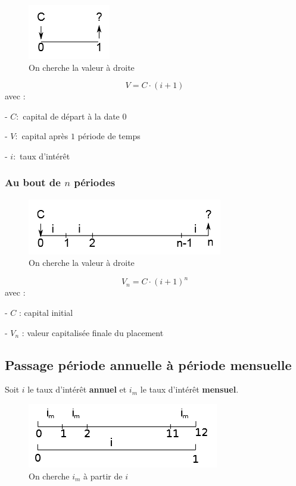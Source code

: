\documentclass{article}
\begin{document}
\begin{figure}[h]
    \centering
    \includegraphics{c0-c1.png}
    \\On cherche la valeur à droite
\end{figure}

$$V = C\cdot(i+1)$$
avec :

- $C :$ capital de départ à la date 0

- $V :$ capital après $1$ période de temps

- $i :$ taux d'intérêt

\subsubsection{Au bout de $n$ périodes}

\begin{figure}[h]
    \centering
    \includegraphics{c0-cn.png}
    \\On cherche la valeur à droite
\end{figure}

$$\boxed{V_n = C\cdot(i+1)^n}$$
avec :

- $C$ : capital initial

- $V_n$ : valeur capitalisée finale du placement


\subsection{Passage période annuelle à période mensuelle}
Soit $i$ le taux d'intérêt \textbf{annuel} et $i_m$ le taux d'intérêt \textbf{mensuel}.

\begin{figure}[H]
    \centering
    \includegraphics{i-im.png}
    \\On cherche $i_m$ à partir de $i$
\end{figure}
\end{document}
